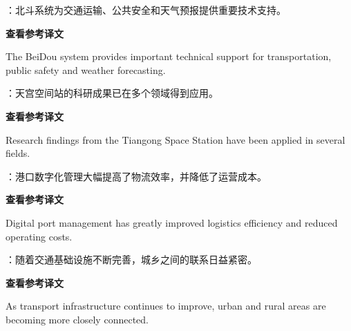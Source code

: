 \documentclass[a4paper,11pt,UTF8,fontset=none]{ctexart}
\begin{document}
\vspace{4pt}

：北斗系统为交通运输、公共安全和天气预报提供重要技术支持。\par

\noindent\colorbox{HeadBlue}{\strut {\bfseries 查看参考译文}}\par\vspace{1pt}

\noindent The BeiDou system provides important technical support for transportation, public safety and weather forecasting.\par

\vspace{4pt}

：天宫空间站的科研成果已在多个领域得到应用。\par

\noindent\colorbox{HeadBlue}{\strut {\bfseries 查看参考译文}}\par\vspace{1pt}

\noindent Research findings from the Tiangong Space Station have been applied in several fields.\par

\vspace{4pt}

：港口数字化管理大幅提高了物流效率，并降低了运营成本。\par

\noindent\colorbox{HeadBlue}{\strut {\bfseries 查看参考译文}}\par\vspace{1pt}

\noindent Digital port management has greatly improved logistics efficiency and reduced operating costs.\par

\vspace{4pt}

：随着交通基础设施不断完善，城乡之间的联系日益紧密。\par

\noindent\colorbox{HeadBlue}{\strut {\bfseries 查看参考译文}}\par\vspace{1pt}

\noindent As transport infrastructure continues to improve, urban and rural areas are becoming more closely connected.\par
\end{document}
